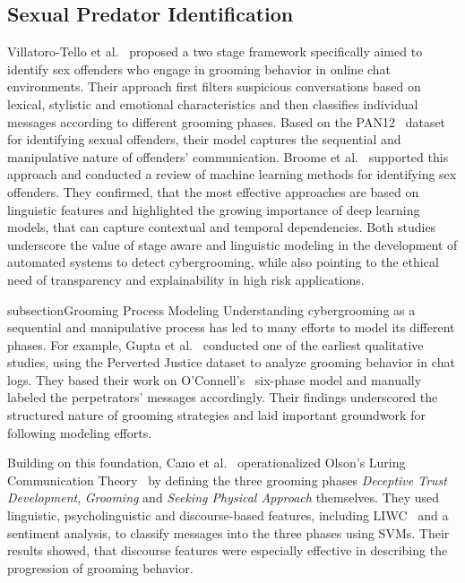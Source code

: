\subsection{Sexual Predator Identification}
Villatoro-Tello et al.~\cite{villatoro2012two} proposed a two stage framework specifically aimed to identify sex offenders who engage in grooming behavior in online chat environments. Their approach first filters suspicious conversations based on lexical, stylistic and emotional characteristics and then classifies individual messages according to different grooming phases. Based on the PAN12~\cite{inches2012pan} dataset for identifying sexual offenders, their model captures the sequential and manipulative nature of offenders' communication. Broome et al.~\cite{broome2020psycholinguistic} supported this approach and conducted a review of machine learning methods for identifying sex offenders. They confirmed, that the most effective approaches are based on linguistic features and highlighted the growing importance of deep learning models, that can capture contextual and temporal dependencies. Both studies underscore the value of stage aware and linguistic modeling in the development of automated systems to detect cybergrooming, while also pointing to the ethical need of transparency and explainability in high risk applications.


subsection{Grooming Process Modeling}
Understanding cybergrooming as a sequential and manipulative process has led to many efforts to model its different phases. For example, Gupta et al.~\cite{gupta2012characterizingpedophileconversationsinternet} conducted one of the earliest qualitative studies, using the Perverted Justice dataset to analyze grooming behavior in chat logs. They based their work on O'Connell's~\cite{oconnell2003typology} six-phase model and manually labeled the perpetrators' messages accordingly. Their findings underscored the structured nature of grooming strategies and laid important groundwork for following modeling efforts. %

Building on this foundation, Cano et al.~\cite{Cano2014} operationalized Olson's Luring Communication Theory~\cite{olsonluring2007} by defining the three grooming phases \textit{Deceptive Trust Development}, \textit{Grooming} and \textit{Seeking Physical Approach} themselves. They used linguistic, psycholinguistic and discourse-based features, including LIWC~\cite{tausczik2010psychological} and a sentiment analysis, to classify messages into the three phases using SVMs. Their results showed, that discourse features were especially effective in describing the progression of grooming behavior.  %

